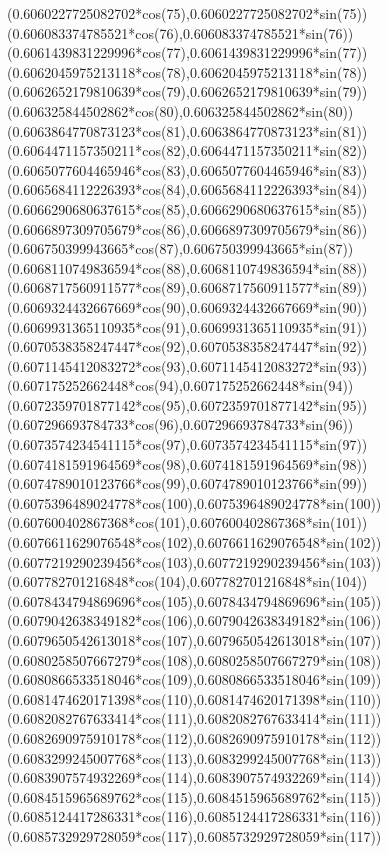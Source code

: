 {({0.6060227725082702*cos(75)},{0.6060227725082702*sin(75)})
({0.606083374785521*cos(76)},{0.606083374785521*sin(76)})
({0.6061439831229996*cos(77)},{0.6061439831229996*sin(77)})
({0.6062045975213118*cos(78)},{0.6062045975213118*sin(78)})
({0.6062652179810639*cos(79)},{0.6062652179810639*sin(79)})
({0.606325844502862*cos(80)},{0.606325844502862*sin(80)})
({0.6063864770873123*cos(81)},{0.6063864770873123*sin(81)})
({0.6064471157350211*cos(82)},{0.6064471157350211*sin(82)})
({0.6065077604465946*cos(83)},{0.6065077604465946*sin(83)})
({0.6065684112226393*cos(84)},{0.6065684112226393*sin(84)})
({0.6066290680637615*cos(85)},{0.6066290680637615*sin(85)})
({0.6066897309705679*cos(86)},{0.6066897309705679*sin(86)})
({0.606750399943665*cos(87)},{0.606750399943665*sin(87)})
({0.6068110749836594*cos(88)},{0.6068110749836594*sin(88)})
({0.6068717560911577*cos(89)},{0.6068717560911577*sin(89)})
({0.6069324432667669*cos(90)},{0.6069324432667669*sin(90)})
({0.6069931365110935*cos(91)},{0.6069931365110935*sin(91)})
({0.6070538358247447*cos(92)},{0.6070538358247447*sin(92)})
({0.6071145412083272*cos(93)},{0.6071145412083272*sin(93)})
({0.607175252662448*cos(94)},{0.607175252662448*sin(94)})
({0.6072359701877142*cos(95)},{0.6072359701877142*sin(95)})
({0.607296693784733*cos(96)},{0.607296693784733*sin(96)})
({0.6073574234541115*cos(97)},{0.6073574234541115*sin(97)})
({0.6074181591964569*cos(98)},{0.6074181591964569*sin(98)})
({0.6074789010123766*cos(99)},{0.6074789010123766*sin(99)})
({0.6075396489024778*cos(100)},{0.6075396489024778*sin(100)})
({0.607600402867368*cos(101)},{0.607600402867368*sin(101)})
({0.6076611629076548*cos(102)},{0.6076611629076548*sin(102)})
({0.6077219290239456*cos(103)},{0.6077219290239456*sin(103)})
({0.607782701216848*cos(104)},{0.607782701216848*sin(104)})
({0.6078434794869696*cos(105)},{0.6078434794869696*sin(105)})
({0.6079042638349182*cos(106)},{0.6079042638349182*sin(106)})
({0.6079650542613018*cos(107)},{0.6079650542613018*sin(107)})
({0.6080258507667279*cos(108)},{0.6080258507667279*sin(108)})
({0.6080866533518046*cos(109)},{0.6080866533518046*sin(109)})
({0.6081474620171398*cos(110)},{0.6081474620171398*sin(110)})
({0.6082082767633414*cos(111)},{0.6082082767633414*sin(111)})
({0.6082690975910178*cos(112)},{0.6082690975910178*sin(112)})
({0.6083299245007768*cos(113)},{0.6083299245007768*sin(113)})
({0.6083907574932269*cos(114)},{0.6083907574932269*sin(114)})
({0.6084515965689762*cos(115)},{0.6084515965689762*sin(115)})
({0.6085124417286331*cos(116)},{0.6085124417286331*sin(116)})
({0.6085732929728059*cos(117)},{0.6085732929728059*sin(117)})
}
